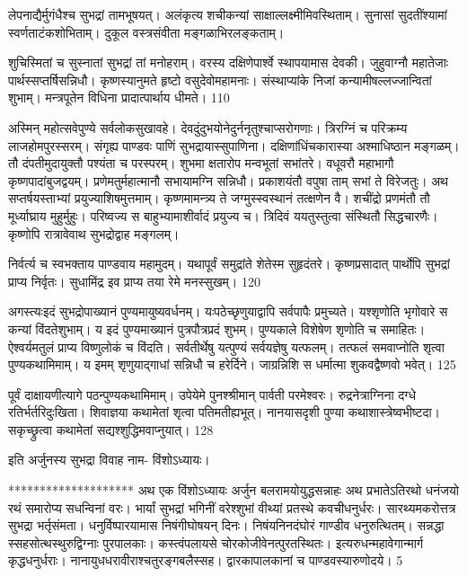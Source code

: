   लेपनाद्यैर्मुगंधैश्च सुभद्रां तामभूषयत्।
 अलंकृत्य शचीकन्यां साक्षाल्लक्ष्मीमिवस्थिताम्।
 सुनासां सुदतींश्यामां स्वर्णताटंकशोभिताम्।
 दुकूल वस्त्रसंवीता मङ्गळाभिरलङ्कताम्।
 
शुचिस्मितां च सुस्नातां सुभद्रां तां मनोहराम्।
 वरस्य दक्षिणेपार्श्वे स्थापयामास देवकी।
 जुहुवाग्नौ महातेजाः पार्थस्सप्तर्षिसन्निधौ।
 कृष्णस्यानुमते हृष्टो वसुदेवोमहामनाः।
 संस्थाप्यांके निजां कन्यामीषल्लज्जान्वितां शुभाम्।
 मन्त्रपूतेन विधिना प्रादात्पार्थाय धीमते।
 110

  अस्मिन् महोत्सवेपुण्ये सर्वलोकसुखावहे।
 देवदुंदुभयोनेदुर्ननृतुश्चाप्सरोगणाः।
 त्रिरग्निं च परिक्रम्य लाजहोमपुरस्सरम्।
 संगृह्य पाण्डवः पाणिं सुभद्रायास्सुपाणिना।
 दक्षिणांधिंचकारास्या अश्माधिष्ठान मङ्गळम्।
 तौ दंपतीमुदायुक्तौ पश्यंता च परस्परम्।
 शुभमा क्षतारोप मन्वभूतां सभांतरे।
 वधूवरौ महाभागौ कृष्णपादांबुजद्वयम्।
 प्रणेमतुर्महात्मानौ सभायामग्नि सन्निधौ।
 प्रकाशयंतौ वपुषा ताम् सभां ते विरेजतुः।
 अथ सप्तर्षयस्ताभ्यां प्रयुज्याशिषमुत्तमाम्।
 कृष्णमामन्त्र्य ते जग्मुस्स्वस्थानं तत्क्षणेन वै।
 शचींद्रो प्रणमंतौ तौ मूर्ध्याघ्राय मुहुर्मुहुः।
 परिष्वज्य स बाहुभ्यामाशीर्वादं प्रयुज्य च।
 त्रिदिवं ययतुस्तुत्वा संस्थितौ सिद्धचारणैः।
 कृष्णोपि रात्रावेवाथ सुभद्रोद्वाह मङ्गलम्।
 
निर्वर्त्य च स्वभक्ताय पाण्डवाय महामुदम्।
 यथापूर्वं समुद्रांते शेतेस्म सुहृदंतरे।
 कृष्णप्रसादात् पार्थोपि सुभद्रां प्राप्य निर्वृतः।
 सुधामिंद्र इव प्राप्य तया रेमे मनस्सुखम्।
 120

  अगस्त्यःइदं सुभद्रोपाख्यानं पुण्यमायुष्यवर्धनम्।
 यःपठेच्छृणुयाद्वापि सर्वपापैः प्रमुच्यते।
 यश्शृणोति भृगोवारे स कन्यां विंदतेशुभाम्।
 य इदं पुण्यमाख्यानं पुत्रपौत्रप्रदं शुभम्।
 पुण्यकाले विशेषेण शृणोति च समाहितः।
 ऐश्वर्यमतुलं प्राप्य विष्णुलोकं च विंदति।
 सर्वतीर्थेषु यत्पुण्यं सर्वयज्ञेषु यत्फलम्।
 तत्फलं समवाप्नोति शृत्वा पुण्यकथामिमाम्।
 य इमम् शृणुयाद्गाधां सन्निधौ च हरेर्दिने।
 जाग्रन्निशि स धर्मात्मा शुकवद्वैष्णवो भवेत्।
 125

  पूर्वं दाक्षायणीत्यागे पठन्पुण्यकथामिमाम्।
 उपेयेमे पुनश्श्रीमान् पार्वती परमेश्वरः।
 रुद्रनेत्राग्निना दग्धे रतिर्भर्तरिदुःखिता।
 शिवाज्ञया कथामेतां शृत्वा पतिमतीह्यभूत्।
 नानयासदृशी पुण्या कथाशास्त्रेष्वभीष्टदा।
 सकृच्छ्रुत्वा कथामेतां सद्यश्शुद्धिमवाप्नुयात्।
 128

  इति अर्जुनस्य सुभद्रा विवाह नाम- विंशोऽध्यायः।
 
********************
अथ एक विंशोऽध्यायः
अर्जुन बलरामयोयुद्धसन्नाहः अथ प्रभातेऽतिरथो धनंजयो रथं
समारोप्य सधन्विनां वरः।
 भार्यां सुभद्रां भगिनीं वरेश्शुभां वीथ्यां
प्रतस्थे कवचीधनुर्धरः।
 सारथ्यमकरोत्तत्र सुभद्रा भर्तृसंमता।
 धनुर्विष्पारयामास निषंगीघोषयन् दिनः।
 निषंयनिनदंघोरं गाण्डीव धनुरुत्थितम्।
 सन्नद्धा स्सहसोत्थस्थुरुद्विग्नाः पुरपालकाः।
 कस्त्वंपलायसे चोरकोजीवेनत्पुरतस्थितः।
 इत्यरुधन्महावेगान्मार्ग कृद्धधनुर्धराः।
 नानायुधधरावीराश्चतुरङ्गबलैस्सह।
 द्वारकापालकानां च पाण्डवस्यारुणोदये।
 5

